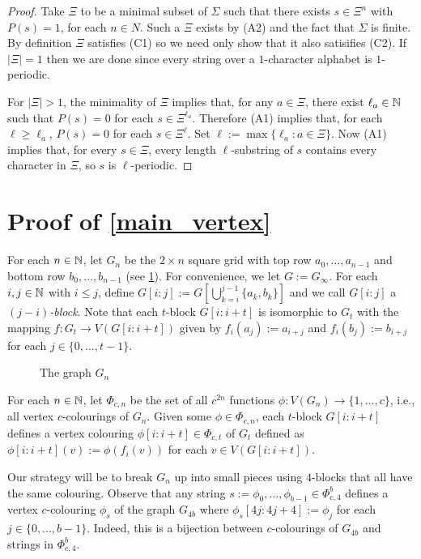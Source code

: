 \documentclass{patmorin}
\begin{document}
\begin{proof}
    Take $\Xi$ to be a minimal subset of $\Sigma$ such that there exists $s\in\Xi^n$ with $P(s)=1$, for each $n\in N$.  Such a $\Xi$ exists by (A2) and the fact that $\Sigma$ is finite. By definition $\Xi$ satisfies (C1) so we need only show that it also satisifies (C2).  If $|\Xi|=1$ then we are done since every string over a $1$-character alphabet is $1$-periodic.

    For $|\Xi|>1$, the minimality of $\Xi$ implies that, for any $a\in\Xi$, there exist $\ell_a\in\mathbb{N}$ such that $P(s)=0$ for each $s\in\Xi^{\ell_a}$.  Therefore (A1) implies that, for each $\ell\ge\ell_a$, $P(s)=0$ for each $s\in\Xi^{\ell}$. Set $\ell:=\max\{\ell_a:a\in \Xi\}$.  Now (A1) implies that, for every $s\in\Xi$, every length $\ell$-substring of $s$ contains every character in $\Xi$, so $s$ is $\ell$-periodic.
\end{proof}


\section{Proof of \cref{main_vertex}}
\label{vertex_colourings}

For each $n\in\mathbb{N}$, let $G_n$ be the $2\times n$ square grid with top row $a_0,\ldots,a_{n-1}$ and bottom row $b_0,\ldots,b_{n-1}$ (see \cref{g_n}). For convenience, we let $G:=G_\infty$.  For each $i,j\in\mathbb{N}$ with $i\le j$, define $G[i\mathbin{:}j]:=G[\bigcup_{k=i}^{j-1}\{a_k,b_k\}]$ and we call $G[i\mathbin{:}j]$ a \emph{$(j-i)$-block}. Note that each $t$-block $G[i\mathbin{:}i+t]$ is isomorphic to $G_t$ with the mapping $f:G_t\to V(G[i\mathbin{:}i+t])$ given by $f_i(a_{j}):=a_{i+j}$ and $f_i(b_{j}):=b_{i+j}$ for each $j\in\{0,\ldots,t-1\}$.

\begin{figure}
    \caption{The graph $G_n$}
    \label{g_n}
\end{figure}

For each $n\in\mathbb{N}$, let $\Phi_{c,n}$ be the set of all $c^{2n}$ functions $\phi:V(G_n)\to\{1,\ldots,c\}$, i.e., all vertex $c$-colourings of $G_n$.
Given some $\phi\in\Phi_{c,n}$, each $t$-block $G[i\mathbin{:}i+t]$ defines a vertex colouring $\phi[i\mathbin{:}i+t]\in \Phi_{c,t}$ of $G_t$ defined as $\phi[i\mathbin{:}i+t](v):=\phi(f_i(v))$ for each $v\in V(G[i\mathbin{:}i+t])$.

Our strategy will be to break $G_n$ up into small pieces using $4$-blocks that all have the same colouring. Observe that any string $s:=\phi_0,\ldots,\phi_{b-1}\in\Phi_{c,4}^b$ defines a vertex $c$-colouring $\phi_s$ of the graph $G_{4b}$ where $\phi_s[4j\mathbin{:}4j+4]:=\phi_j$ for each $j\in\{0,\ldots,b-1\}$.  Indeed, this is a bijection between $c$-colourings of $G_{4b}$ and strings in $\Phi_{c,4}^b$.
\end{document}

